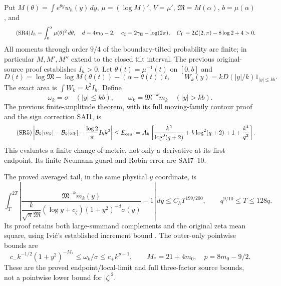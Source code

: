 \documentclass[11pt]{article}
\newcommand{\dd}{\,d}\newcommand{\Tr}{\operatorname{Tr}}
\begin{document}
Put $M(\theta)=\int e^{\theta y}w_h(y)\dd y$, $\mu=(\log M)'$,
$V=\mu'$, $\mathfrak M=M(\alpha)$, $b=\mu(\alpha)$, and
\begin{equation}\tag{SR4}
 I_h=\int_0^\alpha\mu(\theta)^2\dd\theta,\quad d=4m_0-2,\quad
 c_\zeta=2\gamma_{\rm E}-\log(2\pi),\quad
 C_\Gamma=2\mathcal L(2,\pi)-8\log2+4>0.
\end{equation}
All moments through order $9/4$ of the boundary-tilted probability are finite;
in particular $M,M',M''$ extend to the closed tilt interval. The previous
original-source proof establishes $I_h>0$.
Let $\theta(t)=\mu^{-1}(t)$ on $[0,b]$ and
\[
 D(t)=\log\mathfrak M-\log M(\theta(t))-(\alpha-\theta(t))t,
 \qquad W_k(y)=kD(|y|/k)1_{|y|\le kb}.
\]
The exact area is $\int W_k=k^2I_h$. Define
\[
 \omega_k=\sigma\quad(|y|\le kb),\qquad
 \omega_k=\mathfrak M^{-k}m_k\quad(|y|>kb).
\]
The previous finite-amplitude theorem, with its full moving-family contour
proof and the sign correction SAI1, is
\begin{equation}\tag{SR5}
 \left|\mathcal B_k[m_k]-\mathcal B_k[\omega_k]
       -\frac{\log2}{\pi}I_hk^2\right|
 \le E_{\rm cen}:=A_h\left[
 \frac{k^2}{\log^3(q+2)}+k\log^2(q+2)+1+\frac{k^4}{q^2}\right].
\end{equation}
This evaluates a finite change of metric, not only a derivative at its first
endpoint. Its finite Neumann guard and Robin error are SAI7--10.

The proved averaged tail, in the same physical $y$ coordinate, is
\begin{equation}\tag{SR6}
 \int_T^{2T}\left|
 \frac{\mathfrak M^{-k}m_k(y)}
 {\dfrac{k}{\sqrt\pi\mathfrak M}(\log y+c_\zeta)
 (1+y^2)^{-d}\sigma(y)}-1\right|\dd y
 \le C_hT^{199/200},\qquad q^{9/10}\le T\le128q.
\end{equation}
Its proof retains both large-summand complements and the original zeta
mean square, using Ivi\'c's established increment bound \cite{Ivic}.
The outer-only pointwise bounds are
\begin{equation}\tag{SR7}
 c_-k^{-1/2}(1+y^2)^{-M_*}\le\omega_k/\sigma
 \le c_+k^{p+1},\qquad M_*=21+4m_0,\quad p=8m_0-9/2.
\end{equation}
These are the proved endpoint/local-limit and full three-factor source bounds,
not a pointwise lower bound for $|\zeta|^2$.
\end{document}
